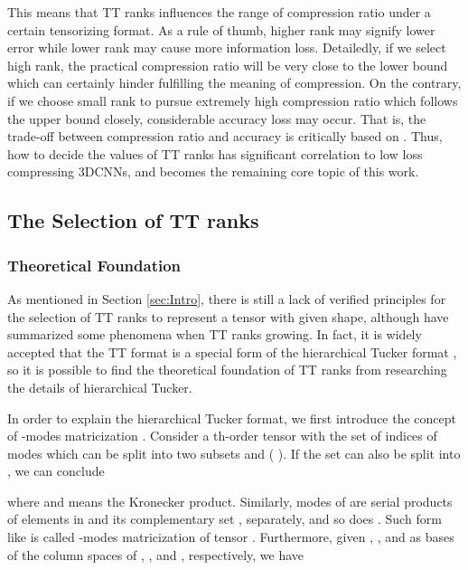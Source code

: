 \documentclass[a4paper,fleqn]{cas-dc}
\begin{document}
This means that TT ranks  influences the range of compression ratio under a certain tensorizing format. As a rule of thumb, higher rank may signify lower error while lower rank may cause more information loss. Detailedly, if we select high rank, the practical compression ratio  will be very close to the lower bound  which can certainly hinder fulfilling the meaning of compression. On the contrary, if we choose small rank to pursue extremely high compression ratio  which follows the upper bound  closely, considerable accuracy loss may occur. That is, the trade-off between compression ratio  and accuracy is critically based on . Thus, how to decide the values of TT ranks has significant correlation to low loss compressing 3DCNNs, and becomes the remaining core topic of this work.

\subsection{The Selection of TT ranks}

\subsubsection{Theoretical Foundation}\quad

As mentioned in Section \ref{sec:Intro}, there is still a lack of verified principles for the selection of TT ranks to represent a tensor with given shape, although \citet{Novikov_2015_TT} have summarized some phenomena when TT ranks growing. In fact, it is widely accepted that the TT format is a special form of the hierarchical Tucker format \citep{Grasedyck_2010_InventHT,Lee_2016_HTTT,Grasedyck_2011_HTTT,Khrulkov_2018_TTRNN}, so it is possible to find the theoretical foundation of TT ranks from researching the details of hierarchical Tucker.

In order to explain the hierarchical Tucker format, we first introduce the concept of -modes matricization \citep{Grasedyck_2010_InventHT}. Consider a th-order tensor  with the set of indices of modes  which can be split into two subsets  and  ( ). If the set   can also be split into , we can conclude \citep{Kressner_2011_HT}

where  and  means the Kronecker product. Similarly, modes of  are serial products of elements in  and its complementary set , separately, and so does . Such form like  is called -modes matricization of tensor . Furthermore, given , , and  as bases of the column spaces of , , and , respectively, we have
\end{document}
